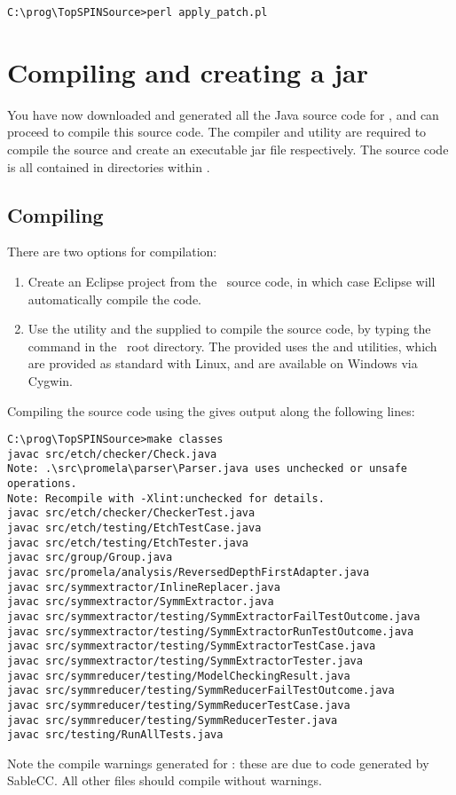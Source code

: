\begin{lstlisting}
C:\prog\TopSPINSource>perl apply_patch.pl
\end{lstlisting}

\section{Compiling and creating a jar}\label{sec:compilingfromsource:compiling}

You have now downloaded and generated all the Java source code for
\topspin, and can proceed to compile this source code.  The
 compiler and  utility are required to
compile the source and create an executable jar file respectively.
The source code is all contained in directories within .

\subsection{Compiling}

There are two options for compilation:

\begin{enumerate}

\item Create an Eclipse project from the \topspin\ source code, in which case
Eclipse will automatically compile the code.

\item Use the  utility and the supplied  to compile
the source code, by typing the command  in the \topspin\
root directory. The provided  uses the 
and \inline{find} utilities, which are provided as standard with
Linux, and are available on Windows via Cygwin.

\end{enumerate}
%
Compiling the source code using the  gives output
along the following lines:
%
\begin{lstlisting}
C:\prog\TopSPINSource>make classes
javac src/etch/checker/Check.java
Note: .\src\promela\parser\Parser.java uses unchecked or unsafe operations.
Note: Recompile with -Xlint:unchecked for details.
javac src/etch/checker/CheckerTest.java
javac src/etch/testing/EtchTestCase.java
javac src/etch/testing/EtchTester.java
javac src/group/Group.java
javac src/promela/analysis/ReversedDepthFirstAdapter.java
javac src/symmextractor/InlineReplacer.java
javac src/symmextractor/SymmExtractor.java
javac src/symmextractor/testing/SymmExtractorFailTestOutcome.java
javac src/symmextractor/testing/SymmExtractorRunTestOutcome.java
javac src/symmextractor/testing/SymmExtractorTestCase.java
javac src/symmextractor/testing/SymmExtractorTester.java
javac src/symmreducer/testing/ModelCheckingResult.java
javac src/symmreducer/testing/SymmReducerFailTestOutcome.java
javac src/symmreducer/testing/SymmReducerTestCase.java
javac src/symmreducer/testing/SymmReducerTester.java
javac src/testing/RunAllTests.java
\end{lstlisting}
%
Note the compile warnings generated for : these
are due to code generated by SableCC.  All other files should
compile without warnings.
%

